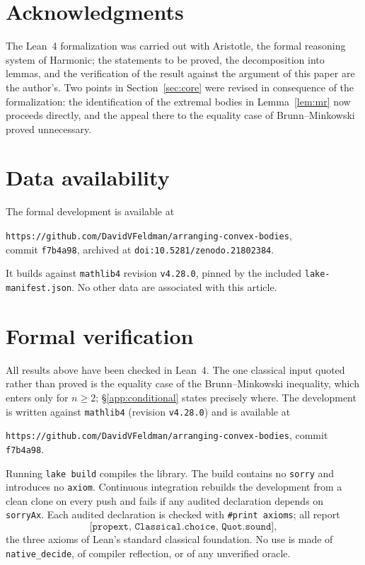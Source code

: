 \documentclass[12pt]{article}
\theoremstyle{definition}
\begin{document}
\section*{Acknowledgments}

The Lean~4 formalization was carried out with Aristotle, the formal reasoning
system of Harmonic; the statements to be proved, the decomposition into lemmas,
and the verification of the result against the argument of this paper are the
author's.  Two points in Section~\ref{sec:core} were revised in consequence of
the formalization: the identification of the extremal bodies in
Lemma~\ref{lem:mr} now proceeds directly, and the appeal there to the equality
case of Brunn--Minkowski proved unnecessary.



\section*{Data availability}

The formal development is available at
\begin{center}
\texttt{https://github.com/DavidVFeldman/arranging-convex-bodies},\\
commit \texttt{f7b4a98},
archived at \texttt{doi:10.5281/zenodo.21802384}.
\end{center}
\noindent
It builds against \texttt{mathlib4} revision \texttt{v4.28.0}, pinned by the
included \texttt{lake-manifest.json}.  No other data are associated with this
article.

\appendix

\section{Formal verification}\label{app:lean}

All results above have been checked in Lean~4.  The one classical input quoted
rather than proved is the equality case of the Brunn--Minkowski inequality,
which enters only for $n\ge2$; \S\ref{app:conditional} states precisely where.
The development is written against \texttt{mathlib4} (revision
\texttt{v4.28.0}) and is available at

\begin{center}
\texttt{https://github.com/DavidVFeldman/arranging-convex-bodies},
commit \texttt{f7b4a98}.
\end{center}

\noindent
Running \texttt{lake build} compiles the library.  The build contains no
\texttt{sorry} and introduces no \texttt{axiom}.  Continuous integration
rebuilds the development from a clean clone on every push and fails if any
audited declaration depends on \texttt{sorryAx}.  Each audited declaration is
checked with \texttt{\#print axioms}; all report
\[
  \texttt{[propext, Classical.choice, Quot.sound]},
\]
the three axioms of Lean's standard classical foundation.  No use is made of
\texttt{native\_decide}, of compiler reflection, or of any unverified oracle.
\end{document}
